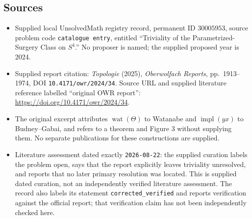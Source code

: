 \documentclass[11pt]{article}
\begin{document}
\subsection{Sources}
\begin{itemize}
\item Supplied local UnsolvedMath registry record, permanent ID \(30005953\), source problem code \texttt{catalogue entry}, entitled ``Triviality of the Parametrized-Surgery Class on \(S^4\).'' No proposer is named; the supplied proposed year is 2024.
\item Supplied report citation: \emph{Topologie} (2025), \emph{Oberwolfach Reports}, pp.~1913--1974, DOI \texttt{10.4171/owr/2024/34}. Source URL and supplied literature reference labelled ``original OWR report'': \url{https://doi.org/10.4171/owr/2024/34}.
\item The original excerpt attributes \(\operatorname{wat}(\Theta)\) to Watanabe and \(\operatorname{impl}(yx)\) to Budney--Gabai, and refers to a theorem and Figure 3 without supplying them. No separate publications for these constructions are supplied.
\item Literature assessment dated exactly \texttt{2026-08-22}: the supplied curation labels the problem open, says that the report explicitly leaves triviality unresolved, and reports that no later primary resolution was located. This is supplied dated curation, not an independently verified literature assessment. The record also labels its statement \texttt{corrected\_verified} and reports verification against the official report; that verification claim has not been independently checked here.
\end{itemize}
\end{document}

